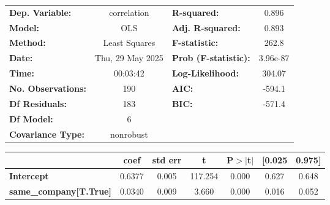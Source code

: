 \begin{center}
\begin{tabular}{lclc}
\toprule
\textbf{Dep. Variable:}                                                        &   correlation    & \textbf{  R-squared:         } &     0.896   \\
\textbf{Model:}                                                                &       OLS        & \textbf{  Adj. R-squared:    } &     0.893   \\
\textbf{Method:}                                                               &  Least Squares   & \textbf{  F-statistic:       } &     262.8   \\
\textbf{Date:}                                                                 & Thu, 29 May 2025 & \textbf{  Prob (F-statistic):} &  3.96e-87   \\
\textbf{Time:}                                                                 &     00:03:42     & \textbf{  Log-Likelihood:    } &    304.07   \\
\textbf{No. Observations:}                                                     &         190      & \textbf{  AIC:               } &    -594.1   \\
\textbf{Df Residuals:}                                                         &         183      & \textbf{  BIC:               } &    -571.4   \\
\textbf{Df Model:}                                                             &           6      & \textbf{                     } &             \\
\textbf{Covariance Type:}                                                      &    nonrobust     & \textbf{                     } &             \\
\bottomrule
\end{tabular}
\begin{tabular}{lcccccc}
                                                                               & \textbf{coef} & \textbf{std err} & \textbf{t} & \textbf{P$> |$t$|$} & \textbf{[0.025} & \textbf{0.975]}  \\
\midrule
\textbf{Intercept}                                                             &       0.6377  &        0.005     &   117.254  &         0.000        &        0.627    &        0.648     \\
\textbf{same\_company[T.True]}                                                 &       0.0340  &        0.009     &     3.660  &         0.000        &        0.016    &        0.052     \\

\end{tabular}
\end{center}
